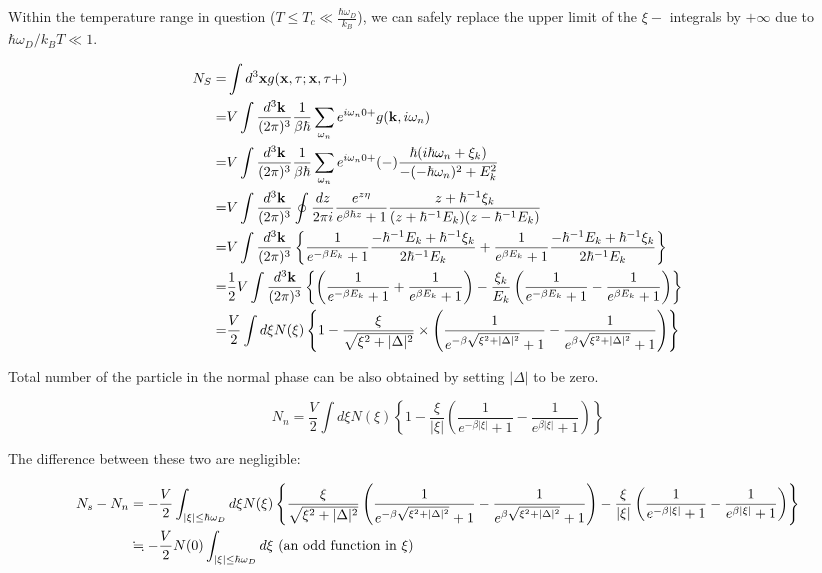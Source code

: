 

Within the temperature range in question ($T\le T_c\ll\frac{\hbar\omega_D}{k_B}$), we can safely replace the upper limit of the $\xi-$ integrals by $+\infty$ due to $\hbar\omega_D/k_BT\ll1$. 



\[\begin{split}
N_S =&\int d^3{\bf x} g({\bf x},\tau;{\bf x},\tau+)\\
=& V\int\frac{d^3\bf k}{(2\pi)^3}\frac{1}{\beta\hbar}\sum_{\omega_n}e^{i\omega_n 0+}g({\bf k},i\omega_n)\\
=& V\int\frac{d^3\bf k}{(2\pi)^3}\frac{1}{\beta\hbar}\sum_{\omega_n}e^{i\omega_n 0+}(-)\frac{\hbar(i\hbar\omega_n+\xi_k)}{-(-\hbar\omega_n)^2+E_k^2}\\
=& V\int\frac{d^3\bf k}{(2\pi)^3}\oint\frac{dz}{2\pi i}\frac{e^{z\eta}}{e^{\beta\hbar z}+1}\frac{z+\hbar^{-1}\xi_k}{(z+\hbar^{-1}E_k)(z-\hbar^{-1}E_k)}\\
=& V\int\frac{d^3\bf k}{(2\pi)^3}\left\{\frac{1}{e^{-\beta E_k}+1}\frac{-\hbar^{-1}E_k+\hbar^{-1}\xi_k}{2\hbar^{-1}E_k}+\frac{1}{e^{\beta E_k}+1}\frac{-\hbar^{-1}E_k+\hbar^{-1}\xi_k}{2\hbar^{-1}E_k}\right\}\\
=& \frac{1}{2}V\int\frac{d^3\bf k}{(2\pi)^3}\left\{\left(\frac{1}{e^{-\beta E_k}+1}+\frac{1}{e^{\beta E_k}+1}\right)-\frac{\xi_k}{E_k}\left(\frac{1}{e^{-\beta E_k}+1}-\frac{1}{e^{\beta E_k}+1}\right)\right\}\\
=&\frac{V}{2}\int d\xi N(\xi)\left\{1-\frac{\xi}{\sqrt{\xi^2+|\Delta|^2}}\times\left(\frac{1}{e^{-\beta\sqrt{\xi^2+|\Delta|^2}}+1} - \frac{1}{e^{\beta\sqrt{\xi^2+|\Delta|^2}}+1}\right)\right\}
\end{split}\]


Total number of the particle in the normal phase can be also obtained by setting $|\Delta|$ to be zero. 

\[N_n = \frac{V}{2}\int d\xi N(\xi)\left\{1-\frac{\xi}{|\xi|}\left(\frac{1}{e^{-\beta|\xi|}+1} - \frac{1}{e^{\beta|\xi|}+1}\right)\right\} \]

The difference between these two are negligible: 

\[\begin{split}
N_s - N_n &= -\frac{V}{2}\int_{|\xi|\le \hbar\omega_D}d\xi N(\xi)\left\{ \frac{\xi}{\sqrt{\xi^2+|\Delta|^2}}\left(\frac{1}{e^{-\beta\sqrt{\xi^2+|\Delta|^2}}+1} - \frac{1}{e^{\beta\sqrt{\xi^2+|\Delta|^2}}+1}\right) - \frac{\xi}{|\xi|}\left(\frac{1}{e^{-\beta|\xi|}+1} - \frac{1}{e^{\beta|\xi|}+1}\right)\right\}\\
&\fallingdotseq-\frac{V}{2}N(0)\int_{|\xi|\le \hbar\omega_D}d\xi\ (\text{an odd function in }\xi)
\end{split}\]

